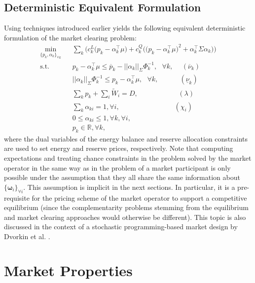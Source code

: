 \documentclass{article}
\begin{document}
\subsection{Deterministic Equivalent Formulation}
Using techniques introduced earlier yields the following equivalent deterministic formulation of the market clearing problem:
\begin{align}
\underset{\{p_k, \alpha_k\}_{\forall k}}{\min} \hspace{10pt} & \sum_k \Big(c_k^L\big(p_k - \alpha_k^\top \mu\big) + c_k^Q \Big(\big(p_k - \alpha_{k}^\top \mu \big)^2 + \alpha_k^\top \Sigma \alpha_k\Big)\Big)\\
\mbox{s.t. } & p_k - \alpha_k^\top \mu\le \overline{p}_k - ||\alpha_k||_{\Sigma} \Phi_k^{-1}, \mbox{ }\forall k, \hspace{15pt}(\overline{\nu}_k)\\
& ||\alpha_k||_{\Sigma} \Phi_k^{-1} \le p_k - \alpha_k^\top \mu, \mbox{ }\forall k, \hspace{37pt}(\underline{\nu}_k)\\
& \sum_k p_k + \sum_i \tilde{W}_i = D, \hspace{70pt} (\lambda)\\
& \sum_k \alpha_{ki} = 1, \forall i, \hspace{95pt} (\chi_i)\\
& 0 \le \alpha_{ki} \le 1, \forall k, \forall i,\\
& p_k \in \mathbb{R}, \forall k,
\end{align}
where the dual variables of the energy balance and reserve allocation constraints are used to set energy and reserve prices, respectively. Note that computing expectations and treating chance constraints in the problem solved by the market operator in the same way as in the problem of a market participant is only possible under the assumption that they all share the same information about $\{\boldsymbol{\omega}_i\}_{\forall i}$. This assumption is implicit in the next sections. In particular, it is a pre-requisite for the pricing scheme of the market operator to support a competitive equilibrium (since the complementarity problems stemming from the equilibrium and market clearing approaches would otherwise be different). This topic is also discussed in the context of a stochastic programming-based market design by Dvorkin et al. \cite{DvorkinV2019}.

\section{Market Properties}
\end{document}
